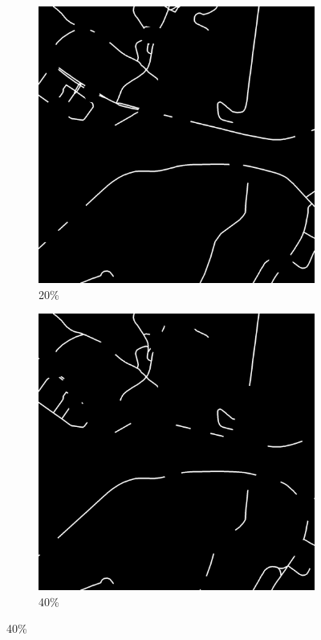 \begin{figure}[!b]
\begin{subfigure}{0.31\textwidth}
\includegraphics[width=\linewidth]{figs/E8/omission/noise2.png}
\caption{20\%}
\end{subfigure}
\hspace*{\fill} %
\begin{subfigure}{0.31\textwidth}
\includegraphics[width=\linewidth]{figs/E8/omission/noise4.png}
\caption{40\%}
\end{subfigure}


\end{figure}
